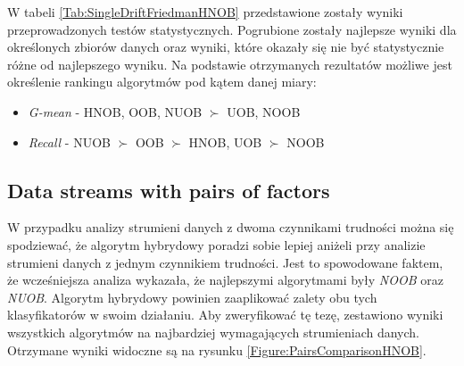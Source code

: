 \noindent W tabeli \ref{Tab:SingleDriftFriedmanHNOB} przedstawione zostały wyniki przeprowadzonych testów statystycznych. Pogrubione zostały najlepsze wyniki dla określonych zbiorów danych oraz wyniki, które okazały się nie być statystycznie różne od najlepszego wyniku. Na podstawie otrzymanych rezultatów możliwe jest określenie rankingu algorytmów pod kątem danej miary:

\begin{itemize}
    \item \textit{G-mean} - HNOB, OOB, NUOB $\succ$ UOB, NOOB
    \item \textit{Recall} - NUOB $\succ$ OOB $\succ$ HNOB, UOB $\succ$ NOOB
\end{itemize}

\subsection{Data streams with pairs of factors}

\noindent W przypadku analizy strumieni danych z dwoma czynnikami trudności można się spodziewać, że algorytm hybrydowy poradzi sobie lepiej aniżeli przy analizie strumieni danych z jednym czynnikiem trudności. Jest to spowodowane faktem, że wcześniejsza analiza wykazała, że najlepszymi algorytmami były \textit{NOOB} oraz \textit{NUOB}. Algorytm hybrydowy powinien zaaplikować zalety obu tych klasyfikatorów w swoim działaniu. Aby zweryfikować tę tezę, zestawiono wyniki wszystkich algorytmów na najbardziej wymagających strumieniach danych. Otrzymane wyniki widoczne są na rysunku \ref{Figure:PairsComparisonHNOB}.

